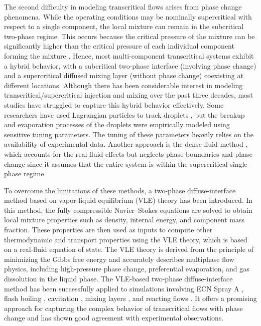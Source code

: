 The second difficulty in modeling transcritical flows arises from phase change phenomena. While the operating conditions may be nominally supercritical with respect to a single component, the local mixture can remain in the subcritical two-phase regime. This occurs because the critical pressure of the mixture can be significantly higher than the critical pressure of each individual component forming the mixture \cite{van1980critical,tudisco2020numerical,zhang2022multicomponent}. Hence, most multi-component transcritical systems exhibit a hybrid behavior, with a subcritical two-phase interface (involving phase change) and a supercritical diffused mixing layer (without phase change) coexisting at different locations. %
Although there has been considerable interest in modeling transcritical/supercritical injection and mixing over the past three decades, most studies have struggled to capture this hybrid behavior effectively. Some researchers have used Lagrangian particles to track droplets \cite{pei2015large,kahila2018large,gadalla2020large}, but the breakup and evaporation processes of the droplets were empirically modeled using sensitive tuning parameters. The tuning of these parameters heavily relies on the availability of experimental data. Another approach is the dense-fluid method \cite{yang2000modeling,lacaze2015analysis,jofre2021transcritical}, which accounts for the real-fluid effects but neglects phase boundaries and phase change since it assumes that the entire system is within the supercritical single-phase regime. 


To overcome the limitations of these methods, a two-phase diffuse-interface method based on vapor-liquid equilibrium (VLE) theory has been introduced. In this method, the fully compressible Navier–Stokes equations are solved to obtain local mixture properties such as density, internal energy, and component mass fraction. These properties are then used as inputs to compute other thermodynamic and transport properties using the VLE theory, which is based on a real-fluid equation of state. The VLE theory is derived from the principle of minimizing the Gibbs free energy and accurately describes multiphase flow physics, including high-pressure phase change, preferential evaporation, and gas dissolution in the liquid phase. The VLE-based two-phase diffuse-interface method has been successfully applied to simulations involving ECN Spray A \cite{matheis2018multi, yang2020real}, flash boiling \cite{yi2019multicomponent}, %
cavitation \cite{yang2020parametric}, mixing layers \cite{tudisco2020vapor}, and reacting flows \cite{fathi2022large,srinivasan2023vle}. It offers a promising approach for capturing the complex behavior of transcritical flows with phase change and has shown good agreement with experimental observations. 


